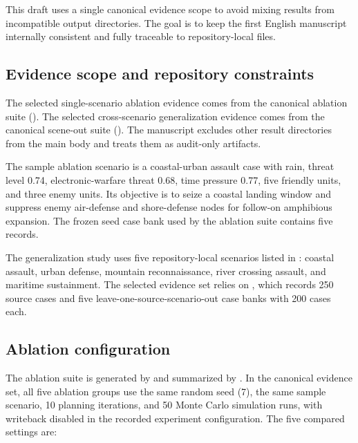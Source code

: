 This draft uses a single canonical evidence scope to avoid mixing results from incompatible output directories. The goal is to keep the first English manuscript internally consistent and fully traceable to repository-local files.

\subsection{Evidence scope and repository constraints}

The selected single-scenario ablation evidence comes from the canonical ablation suite (). The selected cross-scenario generalization evidence comes from the canonical scene-out suite (). The manuscript excludes other result directories from the main body and treats them as audit-only artifacts.

The sample ablation scenario is a coastal-urban assault case with rain, threat level 0.74, electronic-warfare threat 0.68, time pressure 0.77, five friendly units, and three enemy units. Its objective is to seize a coastal landing window and suppress enemy air-defense and shore-defense nodes for follow-on amphibious expansion. The frozen seed case bank used by the ablation suite contains five records.

The generalization study uses five repository-local scenarios listed in : coastal assault, urban defense, mountain reconnaissance, river crossing assault, and maritime sustainment. The selected evidence set relies on , which records 250 source cases and five leave-one-source-scenario-out case banks with 200 cases each.

\subsection{Ablation configuration}

The ablation suite is generated by  and summarized by . In the canonical evidence set, all five ablation groups use the same random seed (7), the same sample scenario, 10 planning iterations, and 50 Monte Carlo simulation runs, with writeback disabled in the recorded experiment configuration. The five compared settings are:

